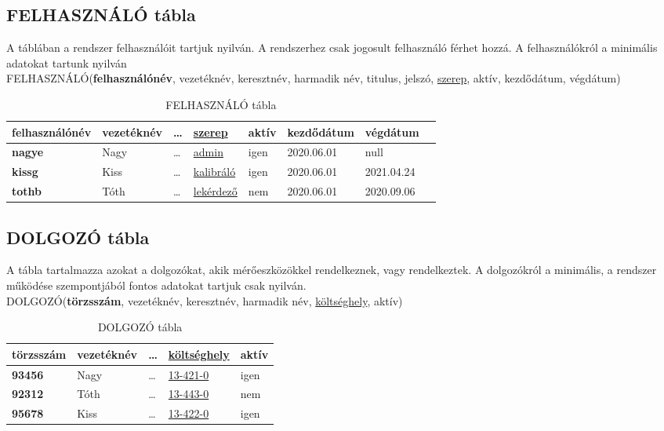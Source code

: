 \documentclass[a4paper,12pt]{report}
\newcommand{\PK}[1]{\textbf{#1}}
\newcommand{\FK}[1]{\underline{#1}}
\newcommand{\TABLA}[1]{\noindent\MakeUppercase{#1}}
\begin{document}
\subsection{FELHASZNÁLÓ tábla}
A táblában a rendszer felhasználóit tartjuk nyilván. A rendszerhez csak 
jogosult felhasználó férhet hozzá. A felhasználókról a minimális adatokat 
tartunk nyilván\\

\TABLA{felhasználó}(\PK{felhasználónév}, vezetéknév, keresztnév, 
harmadik név, titulus, jelszó, \FK{szerep}, aktív, kezdődátum, végdátum)

\begin{table}[ht!]
 \centering
 \begin{tabular}[t]{|l|l|l|l|l|l|l|l|}
  \hline
  
\textbf{felhasználónév}&vezetéknév&\dots&\FK{szerep}
&aktív&kezdődátum&végdátum\\ \hline
  \textbf{nagye}&Nagy&\dots&\FK{admin}&igen&2020.06.01&null \\
  \textbf{kissg}&Kiss&\dots&\FK{kalibráló}&igen&2020.06.01&2021.04.24\\
  \textbf{tothb}&Tóth&\dots&\FK{lekérdező}&nem&2020.06.01&2020.09.06\\
 \end{tabular}
\caption{FELHASZNÁLÓ tábla}\label{tabFEHASZNALO}
\end{table}

\subsection{DOLGOZÓ tábla}
A tábla tartalmazza azokat a dolgozókat, akik mérőeszközökkel 
rendelkeznek, vagy rendelkeztek. A dolgozókról a minimális, a rendszer 
működése szempontjából fontos adatokat tartjuk csak nyilván.\\

\TABLA{dolgozó}(\PK{törzsszám}, vezetéknév, keresztnév, harmadik név, 
\FK{költséghely}, aktív)

\begin{table}[ht!]
 \centering
 \begin{tabular}[t]{|l|l|l|l|l|}
  \hline
\textbf{törzsszám}&vezetéknév&\dots&\FK{költséghely}&aktív\\ 
\hline
  \textbf{93456}&Nagy&\dots&\FK{13-421-0}&igen \\
  \textbf{92312}&Tóth&\dots&\FK{13-443-0}&nem \\
  \textbf{95678}&Kiss&\dots&\FK{13-422-0}&igen\\
 \end{tabular}
\caption{DOLGOZÓ tábla}\label{tabDOLGOZO}
\end{table}
\end{document}
